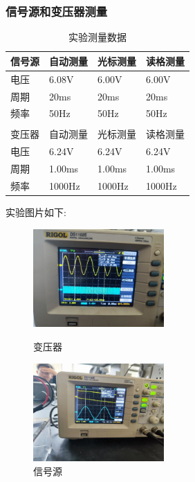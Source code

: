 \documentclass[12pt,a4paper,UTF8]{ctexart}
\begin{document}
	\subsubsection*{信号源和变压器测量}
	\begin{table}[!htbp]
		\centering
		\caption{实验测量数据}
	\begin{tabular}{|p{2cm}|p{2cm}|p{2cm}|p{2cm}|}
		\hline
		\rule{0pt}{16pt} 信号源 & 自动测量 & 光标测量 & 读格测量 \\ \hline
		\rule{0pt}{16pt} 电压  & 6.08V & 6.00V&6.00V\\ \hline
		\rule{0pt}{16pt} 周期  & 20ms  & 20ms & 20ms\\ \hline
		\rule{0pt}{16pt} 频率  & 50Hz  & 50Hz &50Hz \\ \hline
		\rule{0pt}{16pt} &      &      &      \\ \hline
		\rule{0pt}{16pt} 变压器 & 自动测量 & 光标测量 & 读格测量 \\ \hline
		\rule{0pt}{16pt} 电压  & 6.24V& 6.24V     &6.24V\\ \hline
		\rule{0pt}{16pt} 周期  & 1.00ms  & 1.00ms&1.00ms\\ \hline
		\rule{0pt}{16pt} 频率  &  1000Hz& 1000Hz&1000Hz\\ \hline
	\end{tabular}
\end{table}
\par 实验图片如下:
\clearpage
		\begin{figure}[htbp]
		\centering
		\begin{minipage}[t]{0.49\textwidth}
			\centering
			\includegraphics[width=5cm]{图片1}
			\caption{变压器}
		\end{minipage}
		\begin{minipage}[t]{0.49\textwidth}
			\centering
			\includegraphics[width=5cm]{图片2}
			\caption{信号源}
		\end{minipage}
	\end{figure}
\end{document}
